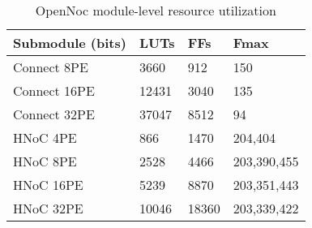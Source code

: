 \begin{table}[!t]
  \centering
  \caption{OpenNoc module-level resource utilization} 
  \begin{tabular}{l|l|l|l}
      \toprule
      Submodule (bits) & LUTs & FFs & Fmax \\
      \midrule
      Connect 8PE      & 3660 & 912 & 150  \\
      Connect 16PE     & 12431 & 3040 & 135 \\
      Connect 32PE     & 37047 & 8512 & 94 \\    
      
      HNoC 4PE         & 866  & 1470 & 204,404\\
      HNoC 8PE         & 2528 & 4466 & 203,390,455\\
      HNoC 16PE        & 5239 & 8870 & 203,351,443 \\
      HNoC 32PE        & 10046 & 18360 & 203,339,422\\
      \bottomrule
    \end{tabular}
	\label{table:systemResourceConsumption}
\end{table}